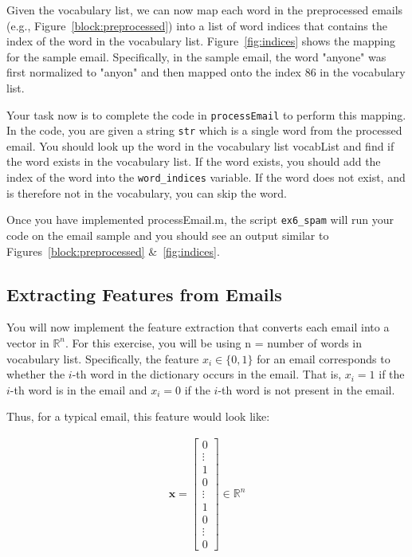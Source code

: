 \documentclass[12pt]{article}
\begin{document}
Given the vocabulary list, we can now map each word in the preprocessed emails (e.g., Figure~\ref{block:preprocessed}) into a list of word indices that contains the index of the word in the vocabulary list. Figure~\ref{fig:indices} shows the mapping for the sample email. Specifically, in the sample email, the word "anyone" was first normalized to "anyon" and then mapped onto the index 86 in the vocabulary list.

Your task now is to complete the code in \texttt{processEmail} to perform this mapping. In the code, you are given a string \texttt{str} which is a single word from the processed email. You should look up the word in the vocabulary list vocabList and find if the word exists in the vocabulary list. If the word exists, you should add the index of the word into the \texttt{word\_indices} variable. If the word does not exist, and is therefore not in the vocabulary, you can skip the word.

Once you have implemented processEmail.m, the script \texttt{ex6\_spam} will run your code on the email sample and you should see an output similar to Figures~\ref{block:preprocessed} &~\ref{fig:indices}.

\subsection{Extracting Features from Emails}

You will now implement the feature extraction that converts each email into a vector in $\mathbb{R}^n$. For this exercise, you will be using n = number of words in vocabulary list. Specifically, the feature $x_i \in \{0,1\}$ for an email corresponds to whether the $i$-th word in the dictionary occurs in the email. That is, $x_i = 1$ if the $i$-th word is in the email and $x_i = 0$ if the $i$-th word is not present in the email.

Thus, for a typical email, this feature would look like:

\begin{align}
  \mathbf x = \begin{bmatrix} 0 \\ \vdots  \\ 1 \\ 0 \\ \vdots  \\ 1 \\ 0 \\ \vdots \\ 0 \end{bmatrix} \in \mathbb{R}^n
\end{align}
\end{document}
